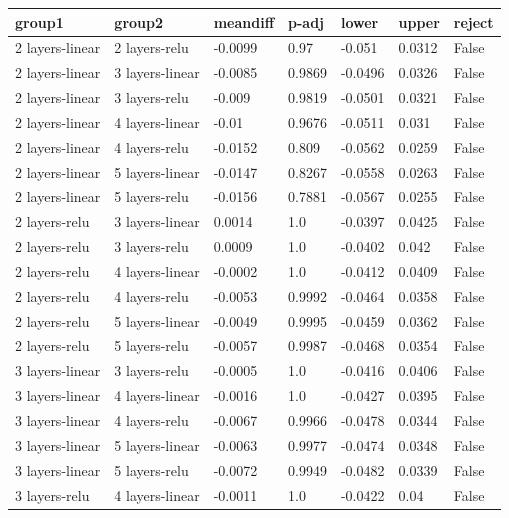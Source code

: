 \documentclass[manuscript,screen,review]{acmart}
\begin{document}
\begin{table}[h]
\begin{tabular}{|l|l|l|l|l|l|l|}
\hline
\textbf{group1} & \textbf{group2} & \textbf{meandiff} & \textbf{p-adj}& \textbf{lower}& \textbf{upper}& \textbf{reject} \\ \hline            
2 layers-linear &  2 layers-relu & -0.0099 & 0.97 & -0.051 & 0.0312 & False \\ \hline
2 layers-linear &3 layers-linear & -0.0085 & 0.9869 & -0.0496 & 0.0326&  False \\ \hline
2 layers-linear &  3 layers-relu &  -0.009 &0.9819 & -0.0501 & 0.0321 & False \\ \hline
2 layers-linear &4 layers-linear &  -0.01 &0.9676 &-0.0511 & 0.031 & False \\ \hline
2 layers-linear &  4 layers-relu &  -0.0152 & 0.809& -0.0562 & 0.0259 & False \\ \hline
2 layers-linear &5 layers-linear & -0.0147 &0.8267 &-0.0558 & 0.0263 & False \\ \hline
2 layers-linear &  5 layers-relu & -0.0156 &0.7881 &-0.0567 & 0.0255 & False \\ \hline
  2 layers-relu &3 layers-linear &  0.0014 &   1.0 &-0.0397 & 0.0425 & False \\ \hline
  2 layers-relu &  3 layers-relu &  0.0009 &   1.0 &-0.0402 & 0.042 & False \\ \hline
  2 layers-relu &4 layers-linear & -0.0002 &   1.0 &-0.0412 &0.0409 & False \\ \hline
  2 layers-relu &  4 layers-relu & -0.0053 &0.9992 &-0.0464 &0.0358 & False \\ \hline
  2 layers-relu &5 layers-linear & -0.0049 &0.9995 &-0.0459 &0.0362 & False \\ \hline
  2 layers-relu &  5 layers-relu & -0.0057 &0.9987 &-0.0468 &0.0354 & False \\ \hline
3 layers-linear &  3 layers-relu & -0.0005 &   1.0 &-0.0416 &0.0406 & False \\ \hline
3 layers-linear &4 layers-linear & -0.0016 &   1.0 &-0.0427 &0.0395 & False \\ \hline
3 layers-linear &  4 layers-relu & -0.0067 &0.9966 &-0.0478 &0.0344 & False \\ \hline
3 layers-linear &5 layers-linear & -0.0063 &0.9977 &-0.0474 &0.0348 & False \\ \hline
3 layers-linear &  5 layers-relu & -0.0072 &0.9949 &-0.0482 &0.0339 & False \\ \hline
  3 layers-relu &4 layers-linear & -0.0011 &   1.0 &-0.0422 &  0.04 & False \\ \hline

\end{tabular}
\end{table}
\end{document}
